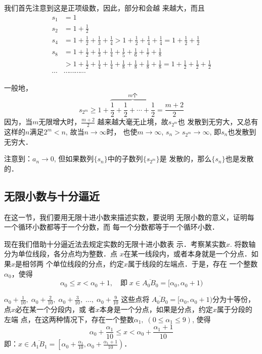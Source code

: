 \begin{solution}
    我们首先注意到这是正项级数，因此，部分和会越
来越大，而且
\[\begin{split}
    s_1&=1          \\
    s_2&=1+\frac{1}{2}          \\
    s_4&=1+\frac{1}{2}+\frac{1}{3}+\frac{1}{4}>1+\frac{1}{2}+\frac{1}{4}+\frac{1}{4}=1+\frac{1}{2}+\frac{1}{2}          \\
    s_8&=1+\frac{1}{2}+\frac{1}{3}+\frac{1}{4}+\frac{1}{5}+\frac{1}{6}+\frac{1}{7}+\frac{1}{8}          \\
    &>1+\frac{1}{2}+\frac{1}{4}+\frac{1}{4}+\frac{1}{8}+\frac{1}{8}+\frac{1}{8}+\frac{1}{8}=1+\frac{1}{2}+\frac{1}{2}+\frac{1}{2}\\
    \cdots &\cdots \cdots \cdots \cdots 
\end{split}\]

一般地，
\[s_{2^m}\ge 1+\overbrace{\frac{1}{2}+\frac{1}{2}+\cdots +\frac{1}{2}}^{\text{$m$个}}=\frac{m+2}{2}\]    
因为，当$m$无限增大时，$\frac{m+2}{2}$
越来越大毫无止境，故$s_{2^m}$也
发散到无穷大，又总有这样的$n$满足$2^m<n$, 故当$n\to\infty$时，
也使$m\to\infty$, $s_n>s_{2^m}\to \infty$, 即$s_n$也发散到无穷大．

注意到：$a_n\to 0$, 但如果数列$\{s_n\}$中的子数列$\{s_{2^m}\}$是
发散的，那么$\{s_n\}$也是发散的．
\end{solution}

\subsection{无限小数与十分逼近}
在这一节，我们要用无限十进小数来描述实数，要说明
无限小数的意义，证明每一个循环小数都等于一个分数，而
每一个分数都等于一个循环小数．

现在我们借助十分逼近法去规定实数的无限十进小数表
示．考察某实数$x$. 将数轴分为单位线段，各分点均为整数．点
$x$在某一线段内，或者本身就是一个分点．如果$x$是相邻两
个单位线段的分点，约定$x$属于线段的左端点．于是，存在
一个整数$\alpha_0$，使得
\[\alpha_0\le x<\alpha_0+1,\quad \text{即}\; x\in \overline{A_0B_0}=[\alpha_0,\alpha_0+1)\]

$\alpha_0+\frac{1}{10},\; \alpha_0+\frac{2}{10},\; \alpha_0+\frac{3}{10},\;\ldots,\; \alpha_0+\frac{9}{10}$
这些点将
$\overline{A_0B_0}=[\alpha_0,\alpha_0+1)$分为十等份，点$x$必在某一个分段内，或
者$x$本身是一个分点，如果是分点，约定$x$属于分段的左端
点，在这两种情况下，存在一个整数$\alpha_1,\; (0\le \alpha_1\le 9)$, 使得
\[\alpha_0+\frac{\alpha_1}{10}\le x<\alpha_0+\frac{\alpha_1+1}{10}\]
即：$x\in\overline{A_1B_1}=\left[\alpha_0+\frac{\alpha_1}{10}, \alpha_0+\frac{\alpha_1+1}{10}\right)$．

